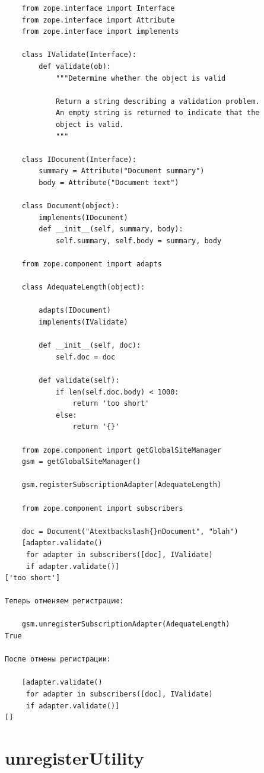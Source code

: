 \documentclass[a4paper,openany,twoside,final]{book}
\begin{document}
\begin{verbatim}
    from zope.interface import Interface
    from zope.interface import Attribute
    from zope.interface import implements

    class IValidate(Interface):
        def validate(ob):
            """Determine whether the object is valid

            Return a string describing a validation problem.
            An empty string is returned to indicate that the
            object is valid.
            """

    class IDocument(Interface):
        summary = Attribute("Document summary")
        body = Attribute("Document text")

    class Document(object):
        implements(IDocument)
        def __init__(self, summary, body):
            self.summary, self.body = summary, body

    from zope.component import adapts

    class AdequateLength(object):

        adapts(IDocument)
        implements(IValidate)

        def __init__(self, doc):
            self.doc = doc

        def validate(self):
            if len(self.doc.body) < 1000:
                return 'too short'
            else:
                return '{}'

    from zope.component import getGlobalSiteManager
    gsm = getGlobalSiteManager()

    gsm.registerSubscriptionAdapter(AdequateLength)

    from zope.component import subscribers

    doc = Document("Atextbackslash{}nDocument", "blah")
    [adapter.validate()
     for adapter in subscribers([doc], IValidate)
     if adapter.validate()]
['too short']

Теперь отменяем регистрацию:

    gsm.unregisterSubscriptionAdapter(AdequateLength)
True

После отмены регистрации:

    [adapter.validate()
     for adapter in subscribers([doc], IValidate)
     if adapter.validate()]
[]
\end{verbatim}


\section*{unregisterUtility%
  \label{unregisterutility}%
}
\end{document}
